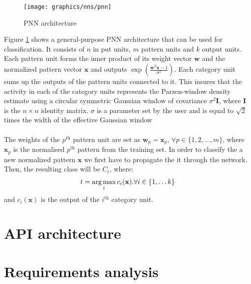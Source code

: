   	\begin{figure}[H]
 		\centering
 		\texttt{[image: graphics/nns/pnn]}
 		\caption{PNN architecture}
 		\label{Fig 2.8}
 	\end{figure}
	 
	 Figure \ref{Fig 2.8} shows a general-purpose PNN architecture that can be used for classification. It consists of $n$ in put units, $m$ pattern units and $k$ output units. Each pattern unit forms the inner product of its weight vector $\mathbf{w}$ and the normalized pattern vector $\mathbf{x}$ and outputs $\exp(\frac{\mathbf{w}^T\mathbf{x} - 1}{\sigma^2})$. Each category unit sums up the outputs of the pattern units connected to it. This insures that the activity in each of the category units represents the Parzen-window density estimate using a circular symmetric Gaussian window of covariance $\sigma^2\mathbf{I}$, where $\mathbf{I}$ is the $n\times n$ identity matrix. $\sigma$ is a parameter set by the user and is equal to $\sqrt{2}$ times the width of the effective Gaussian window
     \\ \\ 
	 The weights of the $p^\text{th}$ pattern unit are set as $\mathbf{w}_p = \mathbf{x}_p$, $\forall p \in \{ 1,2,\dots ,m \}$, where $\mathbf{x}_p$ is the normalised $p^\text{th}$ pattern from the training set. In order to classify the a new normalized pattern $\mathbf{x}$ we first have to propagate the it through the network. Then, the resulting class will be $C_t$, where:
	 \begin{equation}
		 t = \operatorname*{arg\,max}_i c_i(\mathbf{x}). \forall i \in \{1,\dots k\}
	 \end{equation}
	 and $c_i(\mathbf{x})$ is the output of the $i^\text{th}$ category unit.
	\section{API architecture} \label{Section 2.3}
	
	\section{Requirements analysis} \label{Section 2.4}
	
